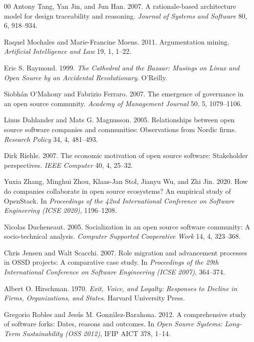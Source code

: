 \documentclass[sigconf,screen]{acmart}
\begin{document}
\begin{thebibliography}{00}
Antony Tang, Yan Jin, and Jun Han. 2007. A rationale-based architecture model for design traceability and reasoning. \emph{Journal of Systems and Software} 80, 6, 918--934.

Raquel Mochales and Marie-Francine Moens. 2011. Argumentation mining. \emph{Artificial Intelligence and Law} 19, 1, 1--22.

Eric S. Raymond. 1999. \emph{The Cathedral and the Bazaar: Musings on Linux and Open Source by an Accidental Revolutionary}. O'Reilly.

Siobh\'an O'Mahony and Fabrizio Ferraro. 2007. The emergence of governance in an open source community. \emph{Academy of Management Journal} 50, 5, 1079--1106.

Linus Dahlander and Mats G. Magnusson. 2005. Relationships between open source software companies and communities: Observations from Nordic firms. \emph{Research Policy} 34, 4, 481--493.

Dirk Riehle. 2007. The economic motivation of open source software: Stakeholder perspectives. \emph{IEEE Computer} 40, 4, 25--32.

Yuxia Zhang, Minghui Zhou, Klaas-Jan Stol, Jianyu Wu, and Zhi Jin. 2020. How do companies collaborate in open source ecosystems? An empirical study of OpenStack. In \emph{Proceedings of the 42nd International Conference on Software Engineering (ICSE 2020)}, 1196--1208.

Nicolas Ducheneaut. 2005. Socialization in an open source software community: A socio-technical analysis. \emph{Computer Supported Cooperative Work} 14, 4, 323--368.

Chris Jensen and Walt Scacchi. 2007. Role migration and advancement processes in OSSD projects: A comparative case study. In \emph{Proceedings of the 29th International Conference on Software Engineering (ICSE 2007)}, 364--374.

Albert O. Hirschman. 1970. \emph{Exit, Voice, and Loyalty: Responses to Decline in Firms, Organizations, and States}. Harvard University Press.

Gregorio Robles and Jes\'us M. Gonz\'alez-Barahona. 2012. A comprehensive study of software forks: Dates, reasons and outcomes. In \emph{Open Source Systems: Long-Term Sustainability (OSS 2012)}, IFIP AICT 378, 1--14.


\end{thebibliography}
\end{document}

